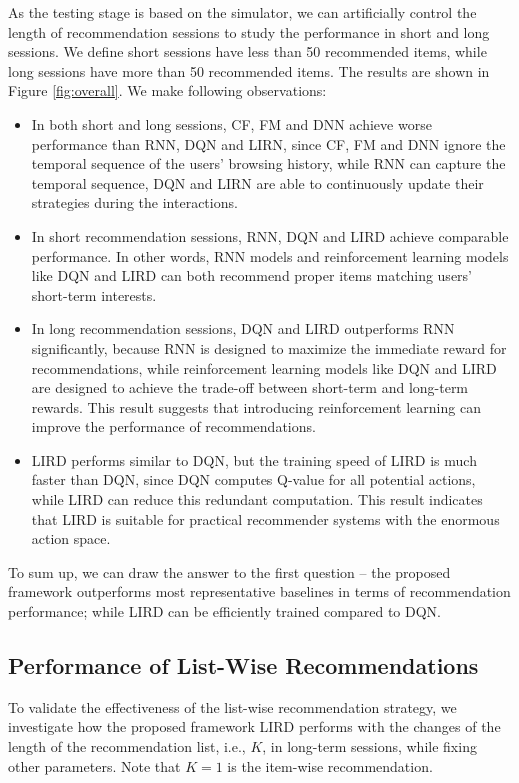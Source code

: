 As the testing stage is based on the simulator, we can artificially control the length of recommendation sessions to study the performance in short and long sessions. We define short sessions have less than 50 recommended items, while long sessions have more than 50 recommended items. The results are shown in Figure \ref{fig:overall}. We make following observations:
\begin{itemize}[leftmargin=*]
\item In both short and long sessions, CF, FM and DNN achieve worse performance than RNN, DQN and LIRN, since CF, FM and DNN ignore the temporal sequence of the users' browsing history, while RNN can capture the temporal sequence, DQN and LIRN are able to continuously update their strategies during the interactions.
\item In short recommendation sessions, RNN, DQN and LIRD achieve comparable performance. In other words, RNN models and reinforcement learning models like DQN and LIRD can both recommend proper items matching users' short-term interests.
\item In long recommendation sessions, DQN and LIRD outperforms RNN significantly, because RNN is designed to maximize the immediate reward for recommendations, while reinforcement learning models like DQN and LIRD are designed to achieve the trade-off between short-term and long-term rewards. This result suggests that introducing reinforcement learning can improve the performance of recommendations.
\item LIRD performs similar to DQN, but the training speed of LIRD is much faster than DQN, since DQN computes Q-value for all potential actions, while LIRD can reduce this redundant computation. This result indicates that LIRD is suitable for practical recommender systems with the enormous action space.
\end{itemize}

To sum up, we can draw the answer to the first question -- the proposed framework outperforms most representative baselines in terms of recommendation performance; while LIRD can be efficiently trained compared to DQN. 

\subsection{Performance of List-Wise Recommendations}

To validate the effectiveness of the list-wise recommendation strategy, we investigate how the proposed framework LIRD performs with the changes of the length of the recommendation list, i.e., $K$, in long-term sessions, while fixing other parameters. Note that $K =1$ is the item-wise recommendation.

